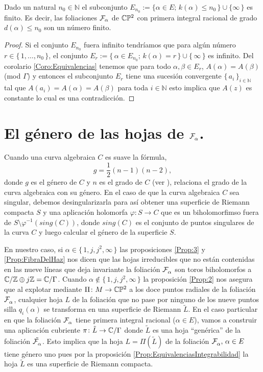 \begin{Teorema}
\label{Teo:GradosGrandes}
Dado un natural $n_{0}\in\mathbb{N}$ el subconjunto $E_{n_{0}}:=\{\alpha\in E;\, k(\alpha)\leq n_{0}\, \}\cup\{\infty \, \}$ es finito. Es decir, las foliaciones $\mathcal{F}_{\alpha}$ de $\mathbb{C}\mathbb{P}^2$ con primera integral racional de grado $d(\alpha)\leq n_{0}$ son un número finito. 
\end{Teorema}
\begin{proof}
Si el conjunto $E_{n_{0}}$ fuera infinito tendríamos que para algún número $r\in\{\, 1,\ldots,n_{0} \, \}$, el conjunto $E_{r}:=\{\, \alpha\in E_{n_{0}};\, k(\alpha)=r \, \}\cup\{\, \infty\, \}$ es infinito. Del corolario \ref{Coro:Equivalencias} tenemos que para todo $\alpha,\beta\in E_{r}$, $A(\alpha)=A(\beta)$ (mod $\Gamma$) y entonces el subconjunto $E_{r}$ tiene una sucesión convergente $\{\, a_{i} \, \}_{i\in\mathbb{N}}$ tal que $A(a_{i})=A(\alpha)=A(\beta)$ para toda $i\in\mathbb{N}$ esto implica que $A(z)$ es constante lo cual es una contradicción.
\end{proof}

\section{El género de las hojas de $\mathcal{F}^{\ }_{\alpha}$.}

Cuando una curva algebraica $C$ es suave la fórmula,
\begin{equation*}
g=\frac{1}{2}(n-1)(n-2),
\end{equation*}
\noindent donde $g$ es el género de $C$ y $n$ es el grado de $C$ (ver \cite{FischerGerd}), relaciona el grado de la curva algebraica con su género. En el caso de que la curva algebraica $C$ sea singular, debemos desingularizarla para así obtener una superficie de Riemann compacta $S$ y una aplicación holomorfa $\varphi\colon S\rightarrow C$ que es un biholomorfimso fuera de $S\setminus\varphi^{-1}(sing(C))$, donde $sing(C)$ es el conjunto de puntos singulares de la curva $C$ y luego calcular el género de la superficie $S$.

En nuestro caso, si $\alpha\in\{\, 1,j,j^{2},\infty \, \}$ las proposiciones \ref{Prop:3} y \ref{Prop:FibraDelHaz} nos dicen que las hojas irreducibles que no están contenidas en las nueve líneas que deja invariante la foliación $\mathcal{F}^{\ }_{\alpha}$ son toros biholomorfos a $\mathbb{C}/\mathbb{Z}\oplus j\mathbb{Z}=\mathbb{C}/\Gamma$. Cuando $\alpha\notin\{\, 1,j,j^{2},\infty \, \}$ la proposición \ref{Prop:2} nos asegura que al explotar mediante $\Pi\colon M\rightarrow \mathbb{C}\mathbb{P}^2$ a los doce puntos radiales de la foliación $\mathcal{F}^{\ }_{\alpha}$, cualquier hoja $L$ de la foliación que no pase por ninguno de los nueve puntos silla $q_{i}(\alpha)$ se transforma en una superficie de Riemann $\tilde{L}$. En el caso particular en que la foliación $\mathcal{F}^{\ }_{\alpha}$ tiene primera integral racional ($\alpha\in E$),  vamos a construir una aplicación cubriente $\pi\colon \tilde{L}\rightarrow \mathbb{C}/\Gamma$ donde $\tilde{L}$ es una hoja ``genérica'' de la foliación $\tilde{\mathcal{F}^{\ }_{\alpha}}$. Esto implica que la hoja $L=\Pi({\tilde{L}})$ de la foliación $\mathcal{F}^{\ }_{\alpha},\, \alpha\in E$ tiene género uno pues por la proposición \ref{Prop:EquivalenciasIntegrabilidad} la hoja $\tilde{L}$ es una superficie de Riemann compacta.\\

